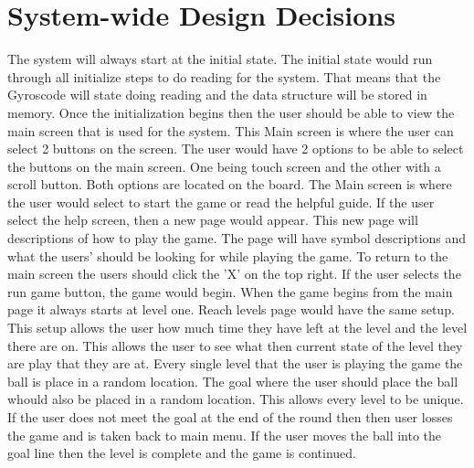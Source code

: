 
\chapter{System-wide Design Decisions}
\label{loc:SystemWideDesignDecisions}


The system will always start at the initial state. The initial state would run through all initialize steps to do reading for the system. That means that the Gyroscode will state doing reading and the data structure will be stored in memory.
Once the initialization begins then the user should be able to view the main screen that is used for the system. This Main screen is where the user can select 2 buttons on the screen. The user would have 2 options to be able to select the buttons on the main screen. One being touch screen and the other with a scroll button. Both options are located on the board.
The Main screen is where the user would select to start the game or read the helpful guide. 
If the user select the help screen, then a new page would appear. This new page will descriptions of how to play the game. The page will have symbol descriptions and what the users' should be looking for while playing the game. To return to the main screen the users should click the 'X' on the top right.
If the user selects the run game button, the game would begin. When the game begins from the main page it always starts at level one. Reach levels page would have the same setup. This setup allows the user how much time they have left at the level and the level there are on. This allows the user to see what then current state of the level they are play that they are at.
Every single level that the user is playing the game the ball is place in a random location. The goal where the user should place the ball whould also be placed in a random location. This allows every level to be unique.
If the user does not meet the goal at the end of the round then then user losses the game and is taken back to main menu.
If the user moves the ball into the goal line then the level is complete and the game is continued.
